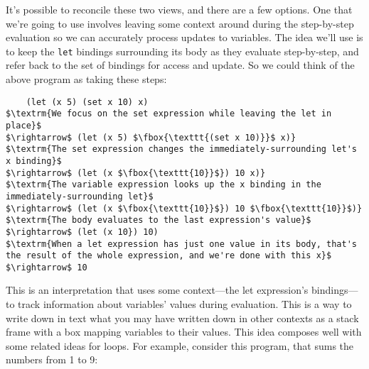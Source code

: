 \documentclass[10pt, oneside]{article}
\begin{document}
It's possible to reconcile these two views, and there are a few options. One
that we're going to use involves leaving some context around during the
step-by-step evaluation so we can accurately process updates to variables.
The idea we'll use is to keep the \texttt{let} bindings surrounding its body
as they evaluate step-by-step, and refer back to the set of bindings for
access and update. So we could think of the above program as taking these
steps:

\begin{lstlisting}
    (let (x 5) (set x 10) x)
$\textrm{We focus on the set expression while leaving the let in place}$
$\rightarrow$ (let (x 5) $\fbox{\texttt{(set x 10)}}$ x)}
$\textrm{The set expression changes the immediately-surrounding let's x binding}$
$\rightarrow$ (let (x $\fbox{\texttt{10}}$}) 10 x)}
$\textrm{The variable expression looks up the x binding in the immediately-surrounding let}$
$\rightarrow$ (let (x $\fbox{\texttt{10}}$}) 10 $\fbox{\texttt{10}}$)}
$\textrm{The body evaluates to the last expression's value}$
$\rightarrow$ (let (x 10}) 10)
$\textrm{When a let expression has just one value in its body, that's the result of the whole expression, and we're done with this x}$
$\rightarrow$ 10
\end{lstlisting}

This is an interpretation that uses some context---the let expression's
bindings---to track information about variables' values during evaluation.
This is a way to write down in text what you may have written down in other
contexts as a stack frame with a box mapping variables to their values. This
idea composes well with some related ideas for loops. For example, consider
this program, that sums the numbers from 1 to 9:
\end{document}
